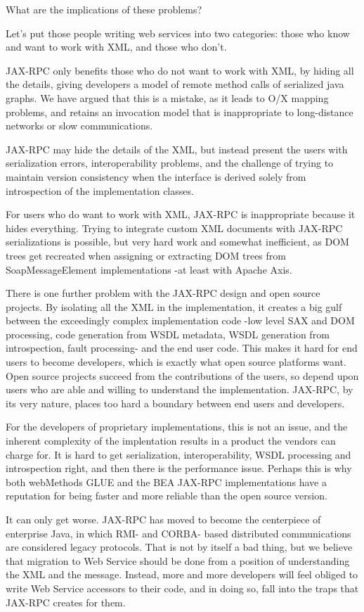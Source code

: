 What are the implications of these problems?

Let's put those people writing web services into two categories: those
who know and want to work with XML, and those who don't. 

JAX-RPC only benefits those who do not want to work with XML, by hiding
all the details, giving developers a model of remote method calls of
serialized java graphs. We have argued that this is a mistake, 
as it leads to O/X mapping problems, and retains an invocation model
that is inappropriate to long-distance networks or slow communications. 

JAX-RPC may hide the details of the XML, but instead present the users
with serialization errors, interoperability problems, and the challenge
of trying to maintain version consistency when the interface is derived
solely from introspection of the implementation classes.


For users who do want to work with XML, JAX-RPC is inappropriate because
it hides everything. Trying to integrate custom XML documents with
JAX-RPC serializations is possible, but very hard work and somewhat
inefficient, as DOM trees get recreated when assigning or extracting DOM
trees from SoapMessageElement implementations -at least with Apache
Axis.

There is one further problem with the JAX-RPC design and open source
projects. By isolating all the XML in the implementation, it creates a
big gulf between the exceedingly complex implementation code -low level
SAX and DOM processing, code generation from WSDL metadata, WSDL
generation from introspection, fault processing- and the end user code.
This makes it hard for end users to become developers, which is exactly
what open source platforms want. Open source projects succeed from the
contributions of the users, so depend upon users who are able and
willing to understand the implementation. JAX-RPC, by its very nature,
places too hard a boundary between end users and developers.

For the developers of proprietary implementations, this is not an issue,
and the inherent complexity of the implentation results in a product the
vendors can charge for. It is hard to get serialization,
interoperability, WSDL processing and introspection right, and then
there is the performance issue. Perhaps this is why both webMethods GLUE
and the BEA JAX-RPC implementations have a reputation for being faster
and more reliable than the open source version. 

It can only get worse. JAX-RPC has moved to become the centerpiece of
enterprise Java, in which RMI- and CORBA- based distributed
communications are considered legacy protocols. That is not by itself a
bad thing, but we believe that migration to Web Service should be done
from a position of understanding the XML and the message. Instead, more
and more developers will feel obliged to write Web Service accessors to
their code, and in doing so, fall into the traps that JAX-RPC creates
for them.

